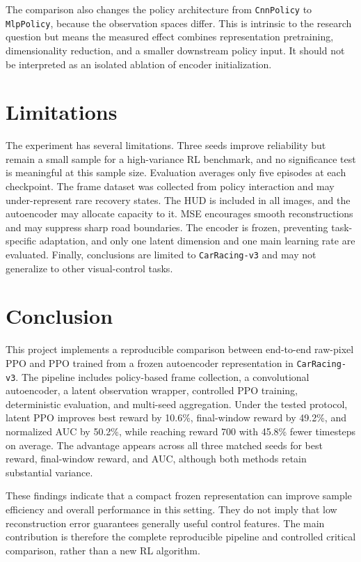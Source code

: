 \documentclass[10pt,twocolumn,a4paper]{article}
\begin{document}
The comparison also changes the policy architecture from \texttt{CnnPolicy} to
\texttt{MlpPolicy}, because the observation spaces differ. This is intrinsic to
the research question but means the measured effect combines representation
pretraining, dimensionality reduction, and a smaller downstream policy input.
It should not be interpreted as an isolated ablation of encoder initialization.

\section{Limitations}

The experiment has several limitations. Three seeds improve reliability but
remain a small sample for a high-variance RL benchmark, and no significance test
is meaningful at this sample size. Evaluation averages only five episodes at
each checkpoint. The frame dataset was collected from policy interaction and
may under-represent rare recovery states. The HUD is included in all images, and
the autoencoder may allocate capacity to it. MSE encourages smooth
reconstructions and may suppress sharp road boundaries. The encoder is frozen,
preventing task-specific adaptation, and only one latent dimension and one main
learning rate are evaluated. Finally, conclusions are limited to
\texttt{CarRacing-v3} and may not generalize to other visual-control tasks.

\section{Conclusion}

This project implements a reproducible comparison between end-to-end raw-pixel
PPO and PPO trained from a frozen autoencoder representation in
\texttt{CarRacing-v3}. The pipeline includes policy-based frame collection, a
convolutional autoencoder, a latent observation wrapper, controlled PPO training,
deterministic evaluation, and multi-seed aggregation. Under the tested protocol,
latent PPO improves best reward by 10.6\%, final-window reward by 49.2\%, and
normalized AUC by 50.2\%, while reaching reward 700 with 45.8\% fewer timesteps
on average. The advantage appears across all three matched seeds for best
reward, final-window reward, and AUC, although both methods retain substantial
variance.

These findings indicate that a compact frozen representation can improve sample
efficiency and overall performance in this setting. They do not imply that low
reconstruction error guarantees generally useful control features. The main
contribution is therefore the complete reproducible pipeline and controlled
critical comparison, rather than a new RL algorithm.
\end{document}
